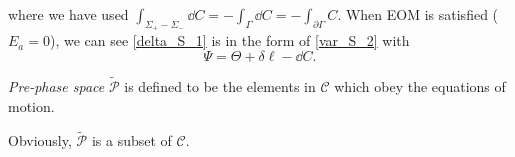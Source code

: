 \documentclass[10pt]{article}
\begin{document}
where we have used $\int_{\Sigma_+ -\Sigma_-}\dd{C}=-\int_\Gamma \dd{C}=-\int_{\partial\Gamma}C$. 
When EOM is satisfied ($E_a=0$), we can see \cref{delta_S_1} is in the form of \cref{var_S_2} with
\begin{equation}
    \Psi=\Theta+\delta\ell-\dd{C}.
\end{equation}

\begin{definition}
    \textit{Pre-phase space} $\tilde{\mathcal{P}}$ is defined to be the elements in $\mathcal{C}$ which obey the equations of motion.
\end{definition}
Obviously, $\tilde{\mathcal{P}}$ is a subset of $\mathcal{C}$.
\end{document}
